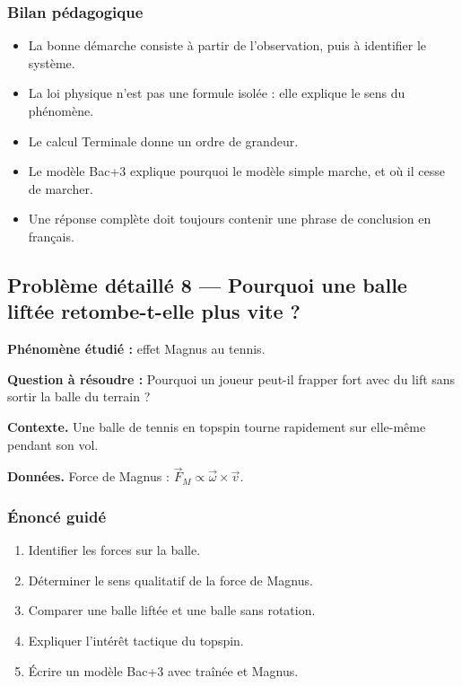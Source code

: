 \documentclass[11pt,a4paper]{article}
\begin{document}
\subsubsection*{Bilan pédagogique}

\begin{methodebox}
\begin{itemize}
  \item La bonne démarche consiste à partir de l'observation, puis à identifier le système.
  \item La loi physique n'est pas une formule isolée : elle explique le sens du phénomène.
  \item Le calcul Terminale donne un ordre de grandeur.
  \item Le modèle Bac+3 explique pourquoi le modèle simple marche, et où il cesse de marcher.
  \item Une réponse complète doit toujours contenir une phrase de conclusion en français.
\end{itemize}
\end{methodebox}

\subsection{Problème détaillé 8 — Pourquoi une balle liftée retombe-t-elle plus vite ?}

\begin{exercicebox}
\textbf{Phénomène étudié :} effet Magnus au tennis.

\medskip
\textbf{Question à résoudre :} Pourquoi un joueur peut-il frapper fort avec du lift sans sortir la balle du terrain ?

\medskip
\textbf{Contexte.} Une balle de tennis en topspin tourne rapidement sur elle-même pendant son vol.

\medskip
\textbf{Données.} Force de Magnus : \(\vec F_M\propto \vec\omega\times\vec v\).
\end{exercicebox}

\subsubsection*{Énoncé guidé}

\begin{enumerate}
  \item Identifier les forces sur la balle.
  \item Déterminer le sens qualitatif de la force de Magnus.
  \item Comparer une balle liftée et une balle sans rotation.
  \item Expliquer l'intérêt tactique du topspin.
  \item Écrire un modèle Bac+3 avec traînée et Magnus.
\end{enumerate}
\end{document}
